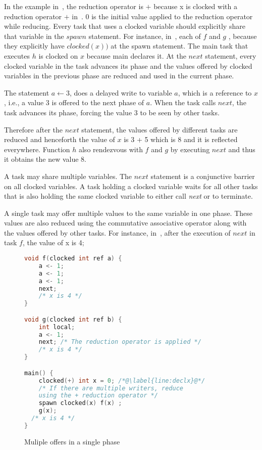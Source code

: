 \documentclass[10pt, conference, compsocconf]{IEEEtran}
\begin{document}
In the example in~, the reduction operator is $+$ because x
is clocked  with a reduction operator $+$ in~.
$0$ is the initial value applied to the reduction operator while reducing.
 Every task that uses a clocked variable should explicitly share that
variable in the $spawn$ statement. 
 For instance, in~, each 
of $f$ and $g$ , because they explicitly have $clocked(x))$ at the
spawn statement. The main task that executes $h$ is clocked on $x$ 
because main declares it.
At the $next$ statement, every clocked variable in the task advances its phase and the values offered
by clocked variables in the previous phase are reduced and used in the current phase. 


The statement $a \leftarrow 3$, does a delayed write to variable $a$, 
which is a reference to $x$, i.e., a value $3$ is offered to the next phase of $a$.
 When the task calls $next$,
the task advances its phase, forcing the value $3$ to be 
seen by other tasks. 

Therefore after the $next$ statement, the values offered by different
tasks are reduced and henceforth the value of $x$ is 3 + 5 which is 8
and it is reflected everywhere.
Function $h$ also rendezvous with $f$ and $g$  by executing $next$
and thus it obtains the new value 8.

 A task may
share multiple variables.
The $next$ statement is a conjunctive barrier on all clocked variables. 
A task holding a clocked variable waits for all other tasks that is also
holding the same clocked variable to either call \emph{next} or to terminate.

A single task may offer multiple values to the same variable in one phase. These values are also reduced using the commutative associative operator along with the values offered by other tasks. For instance, in~, after the execution of 
$next$ in task $f$, the value of x is 4;
\begin{figure}
\begin{lstlisting}[language=C]
void f(clocked int ref a) {
    a <- 1;
    a <- 1;
    a <- 1;
    next;
    /* x is 4 */
}

void g(clocked int ref b) {
    int local;
    a <- 1;
    next; /* The reduction operator is applied */
    /* x is 4 */
}

main() {
    clocked(+) int x = 0; /*@\label{line:declx}@*/
    /* If there are multiple writers, reduce
    using the + reduction operator */
    spawn clocked(x) f(x) ;
    g(x);
  /* x is 4 */
}
\end{lstlisting}
\caption{Muliple offers in a single phase}
\label{fig:ddc-multiple}
\end{figure}
\end{document}
